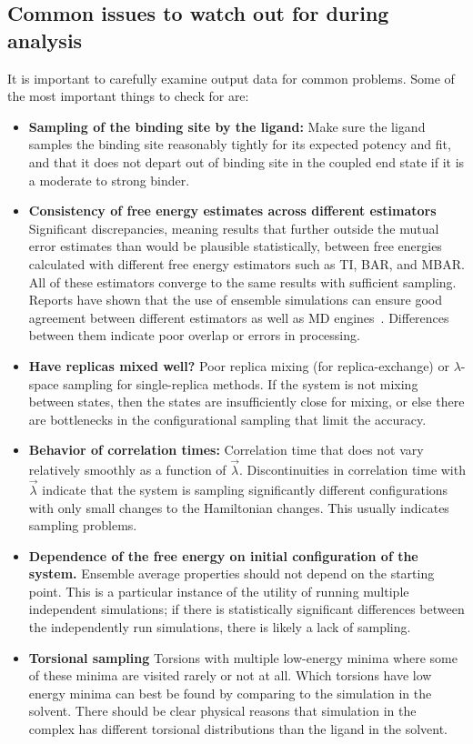 \documentclass[9pt,bestpractices]{livecoms}
\begin{document}
\subsection{Common issues to watch out for during analysis}

It is important to carefully examine output data for common problems. Some of the most important things to check for are:
\begin{itemize}
\item \textbf{Sampling of the binding site by the ligand:} Make sure the ligand samples the binding site reasonably tightly for its expected potency and fit, and that it does not depart out of binding site in the coupled end state if it is a moderate to strong binder. 
\item \textbf{Consistency of free energy estimates across different estimators} Significant discrepancies, meaning results that further outside the mutual error estimates than would be plausible statistically, between free energies calculated with different free energy estimators such as TI, BAR, and MBAR. All of these estimators converge to the same results with sufficient sampling. Reports have shown that the use of ensemble simulations can ensure good agreement between different estimators as well as MD engines~\cite{wade2022}. Differences between them indicate poor overlap or errors in processing.
\item \textbf{Have replicas mixed well?} Poor replica mixing (for replica-exchange) or $\lambda$-space sampling for single-replica methods. If the system is not mixing between states, then the states are insufficiently close for mixing, or else there are bottlenecks in the configurational sampling that limit the accuracy.
\item \textbf{Behavior of correlation times:} Correlation time that does not vary relatively smoothly as a function of $\vec{\lambda}$. Discontinuities in correlation time with $\vec{\lambda}$ indicate that the system is sampling significantly different configurations with only small changes to the Hamiltonian changes. This usually indicates sampling problems.
\item \textbf{Dependence of the free energy on initial configuration of the system.} Ensemble average properties should not depend on the starting point.  This is a particular instance of the utility of running multiple independent simulations; if there is statistically significant differences between the independently run simulations, there is likely a lack of sampling. 
\item \textbf{Torsional sampling} Torsions with multiple low-energy minima where some of these minima are visited rarely or not at all. Which torsions have low energy minima can best be found by comparing to the simulation in the solvent. There should be clear physical reasons that simulation in the complex has different torsional distributions than the ligand in the solvent. 

\end{itemize}
\end{document}
